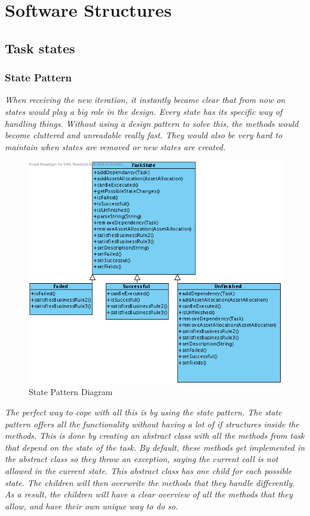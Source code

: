 	\section{Software Structures}
		\subsection{Task states}
			\subsubsection{State Pattern}
				\emph{When receiving the new iteration, it instantly became clear that from now on states would play a big role in the design. Every state has its specific way of handling things. Without using a design pattern to solve this, the methods would become cluttered and unreadable really fast. They would also be very hard to maintain when states are removed or new states are created.}
				\begin{figure}[H]
					\begin{center}
						\includegraphics[scale=0.6]{images/State_Pattern.png}
					\end{center}
					\caption{State Pattern Diagram}
				\end{figure}
				
			
				\emph{The perfect way to cope with all this is by using the state pattern. The state pattern offers all the functionality without having a lot of if structures inside the methods. This is done by creating an abstract class with all the methods from task that depend on the state of the task. By default, these methods get implemented in the abstract class so they throw an exception, saying the current call is not allowed in  the current state. This abstract class has one child for each possible state. The children will then overwrite the methods that they handle differently. As a result, the children will have a clear overview of all the methods that they allow, and have their own unique way to do so.}
			

